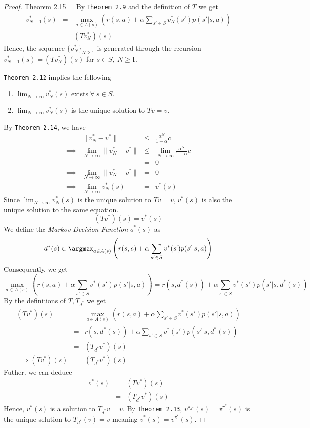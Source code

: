 \documentclass[11pt,a4paper]{article}
\begin{document}
  \begin{proof}{Theorem 2.15}
    \everymath={\displaystyle}
    By \texttt{Theorem 2.9} and the definition of $T$ we get
    \[\begin{array}{rcl}
      v_{N+1}^*(s)&=&\max_{a\in A(s)}\left(r(s,a)+\alpha\sum_{s'\in S}v_N^*(s')p(s'|s,a)\right)\\
      &=&(Tv_N^*)(s)
    \end{array}\]
    Hence, the sequence $\{v_N^*\}_{N\geq1}$ is generated through the recursion $v_{N+1}^*(s)=(Tv^*_N)(s)$ for $s\in S,\ N\geq1$.
    \par \texttt{Theorem 2.12}  implies the following
    \begin{enumerate}
      \item $\lim_{N\to\infty}v_N^*(s)$ exists $\forall\ s\in S$.
      \item $\lim_{N\to\infty}v_N^*(s)$ is the unique solution to $Tv=v$.
    \end{enumerate}
    By \texttt{Theorem 2.14}, we have
    \[\begin{array}{rrcl}
      &\|v_N^*-v^*\|&\leq&\frac{\alpha^N}{1-\alpha}c\\
      \implies&\lim_{N\to\infty}\|v_N^*-v^*\|&\leq&\lim_{N\to\infty}\frac{\alpha^N}{1-\alpha}c\\
      &&=&0\\
      \implies&\lim_{N\to\infty}\|v_N^*-v^*\|&=&0\\
      \implies&\lim_{N\to\infty}v_N^*(s)&=&v^*(s)
    \end{array}\]
    Since $\lim_{N\to\infty}v_N^*(s)$ is the unique solution to $Tv=v$, $v^*(s)$ is also the unique solution to the same equation.
    \[ (Tv^*)(s)=v^*(s) \]
    We define the \textit{Markov Decision Function} $d^*(s)$ as
    \[ d^*(s)\in\argmax_{a\in A(s)}\left(r(s,a)+\alpha\sum_{s'\in S}v^*(s')p(s'|s,a)\right)\]
    Consequently, we get
    \[ \max_{a\in A(s)}\left(r(s,a)+\alpha\sum_{s'\in S}v^*(s')p(s'|s,a)\right)=r(s,d^*(s))+\alpha\sum_{s'\in S}v^*(s')p(s'|s,d^*(s)) \]
    By the definitions of $T, T_{d^*}$ we get
    \[\begin{array}{rcl}
      (Tv^*)(s)&=&\max_{a\in A(s)}\left(r(s,a)+\alpha\sum_{s'\in S}v^*(s')p(s'|s,a)\right)\\
      &=&r(s,d^*(s))+\alpha\sum_{s'\in S}v^*(s')p(s'|s,d^*(s))\\
      &=&(T_{d^*}v^*)(s)\\
      \implies (Tv^*)(s)&=&(T_{d^*}v^*)(s)
    \end{array}\]
    Futher, we can deduce
    \[\begin{array}{rcl}
      v^*(s)&=&(Tv^*)(s)\\
      &=&(T_{d^*}v^*)(s)
    \end{array}\]
    Hence, $v^*(s)$ is a solution to $T_{d^*}v=v$. By \texttt{Theorem 2.13}, $v^{\pi_{d^*}}(s)=v^{\pi^*}(s)$ is the unique solution to $T_{d^*}(v)=v$ meaning $v^*(s)=v^{\pi^*}(s)$.
    \proved
  \end{proof}
\end{document}
